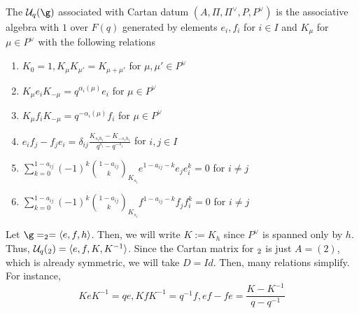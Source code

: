 \documentclass[11pt,leqno,oneside]{amsart}
\numberwithin{thm}{section}
\newcommand{\weightlattice}{P}
\renewcommand{\simpleroots}{\Pi}
\newcommand{\U}{\mathcal{U}}
\newcommand{\qbinom}[3][q]{\binom{#2}{#3}_{#1}}
\begin{document}
\begin{defn}
  The  \(\U_q(\g)\) associated with Cartan datum
  \((A, \simpleroots, \simpleroots^\vee, \weightlattice,
  \weightlattice^\vee)\) is the associative algebra with \(1\) over
  \(F(q)\) generated by elements \(e_i, f_i\) for \(i \in I\) and
  \(K_\mu\) for \(\mu \in \weightlattice^\vee\) with the following
  relations
  \begin{enumerate}
  \item \(K_0 = 1, K_{\mu} K_{\mu'} = K_{\mu+\mu'}\) for \(\mu,\mu' \in
    \weightlattice^\vee\)
  \item \(K_\mu e_i K_{-\mu} = q^{\alpha_i(\mu)}e_i\) for \(\mu \in
    \weightlattice^\vee\) 
  \item \(K_\mu f_i K_{-\mu} = q^{-\alpha_i(\mu)}f_i\) for \(\mu \in
    \weightlattice^\vee\)
  \item \(e_i f_j - f_j e_i = \delta_{ij} \frac{K_{s_i h_i} - K_{-s_i
        h_i}}{q^{s_i} - q^{-s_i}}\) for \(i,j \in I\)
  \item \(\sum_{k=0}^{1-a_{ij}} (-1)^k \qbinom[K_{s_i}]{1-a_{ij}}{k}
    e^{1-a_{ij}-k}e_j e_i^k = 0\) for \(i \neq j\)
  \item \(\sum_{k=0}^{1-a_{ij}} (-1)^k \qbinom[K_{s_i}]{1-a_{ij}}{k}
    f^{1-a_{ij}-k}f_j f_i^k = 0\) for \(i \neq j\)
  \end{enumerate}
\end{defn}
\begin{example}
  Let \(\g = \sl_2 = \langle e,f,h \rangle\). Then, we will write \(K
  := K_h\) since 
  \(\weightlattice^\vee\) is spanned only by \(h\). Thus,
  \(\U_q(\sl_2) = 
  \langle e,f,K,K^{-1} 
  \rangle\). Since the Cartan matrix for \(\sl_2\) is just \(A =
  (2)\), which is already symmetric, we will take \(D = Id\). Then, many relations simplify. For instance, \[
    K e K^{-1} = q e, K f K^{-1}= q^{-1} f, ef-fe =
    \frac{K-K^{-1}}{q-q^{-1}} 
  \]
\end{example}
\end{document}
